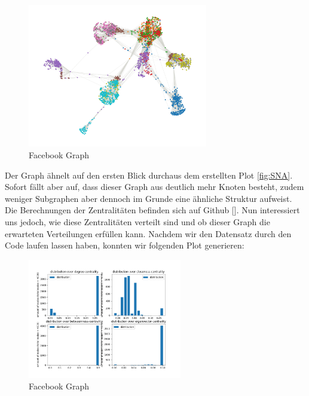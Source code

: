 \FloatBarrier
\begin{figure}[h!]%
  \centering
 \includegraphics[width=0.7\textwidth]{Graphics/FacebookPoliticalPlot.png}
  \caption{Facebook Graph}
  \label{fig:FacebookGraph}
\end{figure}
\FloatBarrier



Der Graph ähnelt auf den ersten Blick durchaus dem erstellten Plot \ref{fig:SNA}. Sofort fällt aber auf, dass dieser Graph aus deutlich mehr Knoten besteht, zudem weniger Subgraphen aber dennoch im Grunde eine ähnliche Struktur aufweist. Die Berechnungen der Zentralitäten befinden sich auf Github []. Nun interessiert uns jedoch, wie diese Zentralitäten verteilt sind und ob dieser Graph die erwarteten Verteilungen erfüllen kann. Nachdem wir den Datensatz durch den Code laufen lassen haben, konnten wir folgenden Plot generieren:

\FloatBarrier
\begin{figure}[h!]%
  \centering
\includegraphics[width=0.6\textwidth]{Graphics/FacebookPoliticalDistribution.png}
  \caption{Facebook Graph}
  \label{fig:FacebookGraph}
\end{figure}
\FloatBarrier

